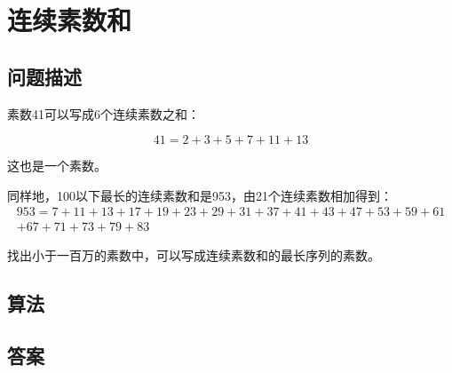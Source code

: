 \section{连续素数和}
\subsection{问题描述}
\begin{tcolorbox}
	素数41可以写成6个连续素数之和：

	\[
		41 = 2 + 3 + 5 + 7 + 11 + 13
	\]

	这也是一个素数。

	同样地，100以下最长的连续素数和是953，由21个连续素数相加得到：
	\begin{multline*}
		953 = 7 + 11 + 13 + 17 + 19 + 23 + 29 + 31 + 37 + 41 + 43 + 47 + 53 + 59 + 61\\ + 67 + 71 + 73 + 79 + 83
	\end{multline*}

	找出小于一百万的素数中，可以写成连续素数和的最长序列的素数。

\end{tcolorbox}

\subsection{算法}

\subsection{答案}
